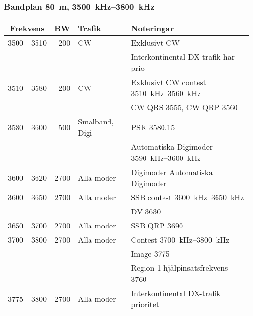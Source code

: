\subsubsection{Bandplan \SI{80}{\metre}, \SIrange{3500}{3800}{\kilo\hertz}}
\begin{tabular}{rrrll}
\multicolumn{2}{c}{\textbf{Frekvens}} & \textbf{BW} & \textbf{Trafik}
& \textbf{Noteringar} \\ \hline

3500 & 3510 & 200  & CW             & Exklusivt CW                                    \\ 
     &      &      &                & Interkontinental DX-trafik har prio             \\ \hline
3510 & 3580 & 200  & CW             & Exklusivt CW contest \SIrange{3510}{3560}{\kilo\hertz}  \\ 
     &      &      &                & CW QRS \num{3555}, CW QRP \num{3560}            \\ \hline
3580 & 3600 & 500  & Smalband, Digi & PSK \num{3580,15}                               \\
     &      &      &                & Automatiska Digimoder \SIrange{3590}{3600}{\kilo\hertz} \\ \hline
3600 & 3620 & 2700 & Alla moder     & Digimoder Automatiska Digimoder                 \\ \hline
3600 & 3650 & 2700 & Alla moder     & SSB contest \SIrange{3600}{3650}{\kilo\hertz}           \\
     &      &      &                & DV \num{3630}                                   \\ \hline
3650 & 3700 & 2700 & Alla moder     & SSB QRP \num{3690}                              \\ \hline
3700 & 3800 & 2700 & Alla moder     & Contest \SIrange{3700}{3800}{\kilo\hertz}               \\
     &      &      &                & Image \num{3775}                                \\
     &      &      &                & Region 1 hjälpinsatsfrekvens \num{3760}         \\ \hline
3775 & 3800 & 2700 & Alla moder     & Interkontinental DX-trafik prioritet            \\ \hline
\end{tabular}

